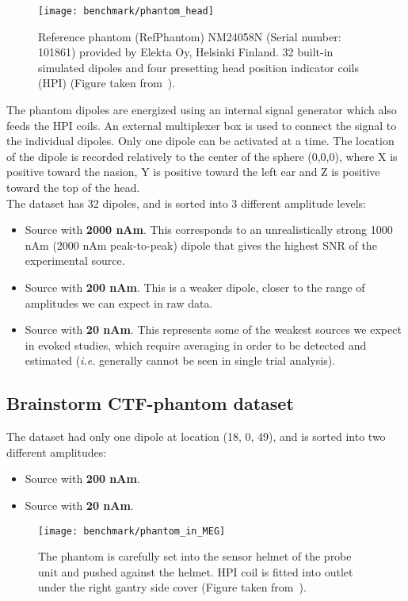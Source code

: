\begin{figure}[tb]
   \centering
\texttt{[image: benchmark/phantom\_head]}
\caption{Reference phantom (RefPhantom) NM24058N (Serial number: 101861) provided by Elekta Oy, Helsinki Finland. 32 built-in simulated dipoles and four presetting head position indicator coils (HPI) (Figure taken from~\cite{hazim2015magnetoencephalography}).}
   \label{fig:phantom_head}
\end{figure}

The phantom dipoles are energized using an internal signal generator which also feeds the HPI coils. An external multiplexer box is used to connect the signal to the individual dipoles. Only one dipole can be activated at a time. The location of the dipole is recorded relatively to the center of the sphere (0,0,0), where X is positive toward the nasion, Y is positive toward the left ear and Z is positive toward the top of the head.\\

The dataset has 32 dipoles, and is sorted into 3 different amplitude levels:
\begin{itemize}
\item Source with \textbf{2000 nAm}. This corresponds to an unrealistically strong 1000 nAm (2000 nAm peak-to-peak) dipole that gives the highest SNR of the experimental source.
\item Source with \textbf{200 nAm}. This is a weaker dipole, closer to the range of amplitudes we can expect in raw data.
\item Source with \textbf{20 nAm}. This represents some of the weakest sources we expect in evoked studies, which require averaging in order to be detected and estimated (\textit{i.e.} generally cannot be seen in single trial analysis).
\end{itemize}

\subsection{Brainstorm CTF-phantom dataset}

The dataset had only one dipole at location (18, 0, 49), and is sorted into two different amplitudes:
\begin{itemize}
\item Source with \textbf{200 nAm}.
\item Source with \textbf{20 nAm}.
\end{itemize}

\begin{figure}[tb]
   \centering
\texttt{[image: benchmark/phantom\_in\_MEG]}
\caption{The phantom is carefully set into the sensor helmet of the probe unit and pushed against the helmet. HPI coil is fitted into outlet under the right gantry side cover (Figure taken from~\cite{hazim2015magnetoencephalography}).}
   \label{fig:phantom_in_MEG}
\end{figure}


